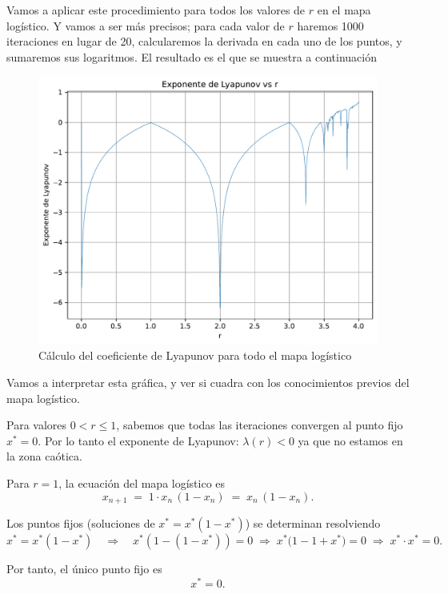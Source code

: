 \documentclass[
  10pt,
  a4paper,
  DIV=11,
  numbers=noendperiod,
  open=any]{scrreprt}
\numberwithin{equation}{chapter}
\numberwithin{equation}{section}
\renewcommand{\[}{\begin{equation}}
\renewcommand{\]}{\end{equation}}
\begin{document}
Vamos a aplicar este procedimiento para todos los valores de \(r\) en el
mapa logístico. Y vamos a ser más precisos; para cada valor de \(r\)
haremos 1000 iteraciones en lugar de 20, calcularemos la derivada en
cada uno de los puntos, y sumaremos sus logaritmos. El resultado es el
que se muestra a continuación


\begin{figure}[h]
  \centering
  \includegraphics[keepaspectratio]{01-logistica/lyapunov_files/figure-pdf/cell-10-output-1.pdf}
  \caption{Cálculo del coeficiente de Lyapunov para todo el mapa logístico}
\end{figure} 

Vamos a interpretar esta gráfica, y ver si cuadra con los conocimientos
previos del mapa logístico.

Para valores \textbf{\(0 < r \le 1\)}, sabemos que todas las iteraciones
convergen al punto fijo \(x^* = 0\). Por lo tanto el exponente de
Lyapunov: \(\lambda(r) < 0\) ya que no estamos en la zona caótica.

Para \(r = 1\), la ecuación del mapa logístico es \[
   x_{n+1} \;=\; 1 \cdot x_n \,(1 - x_n) \;=\; x_n \,(1 - x_n).
   \]

Los puntos fijos (soluciones de \(x^* = x^*(1 - x^*)\)) se determinan
resolviendo \[
   x^* = x^*(1 - x^*) 
   \quad\Longrightarrow\quad
   x^*(1 - (1 - x^*)) = 0 
   \;\Longrightarrow\;
   x^* \bigl(1 - 1 + x^*\bigr) = 0 
   \;\Longrightarrow\;
   x^* \cdot x^* = 0.
   \]

Por tanto, el único punto fijo es \[
   x^* = 0.
   \]
\end{document}
